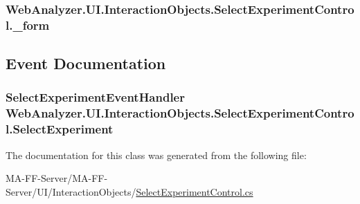 \subsubsection[{\+\_\+form}]{ Web\+Analyzer.\+U\+I.\+Interaction\+Objects.\+Select\+Experiment\+Control.\+\_\+form\hspace{0.3cm}{\ttfamily [private]}}\label{class_web_analyzer_1_1_u_i_1_1_interaction_objects_1_1_select_experiment_control_ac6586d336cac091bf139064cf7a72a13}


\subsection{Event Documentation}
\hypertarget{class_web_analyzer_1_1_u_i_1_1_interaction_objects_1_1_select_experiment_control_a7062e7537081a90d11a7c26cefe79651}{}
\subsubsection[{Select\+Experiment}]{\setlength{\rightskip}{0pt plus 5cm}Select\+Experiment\+Event\+Handler Web\+Analyzer.\+U\+I.\+Interaction\+Objects.\+Select\+Experiment\+Control.\+Select\+Experiment}\label{class_web_analyzer_1_1_u_i_1_1_interaction_objects_1_1_select_experiment_control_a7062e7537081a90d11a7c26cefe79651}


The documentation for this class was generated from the following file\+:\begin{DoxyCompactItemize}
\item 
M\+A-\/\+F\+F-\/\+Server/\+M\+A-\/\+F\+F-\/\+Server/\+U\+I/\+Interaction\+Objects/\hyperlink{_select_experiment_control_8cs}{Select\+Experiment\+Control.\+cs}\end{DoxyCompactItemize}
